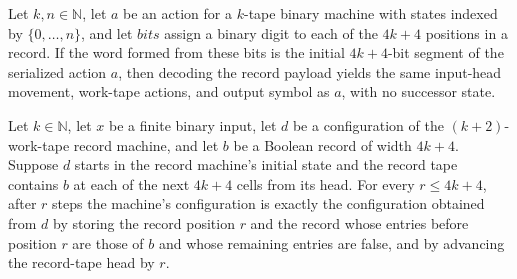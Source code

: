 \begin{lemma}
\label{Turing.StepBlock.payload_correct}
\leanok
{}
Let $k,n\in\mathbb N$, let $a$ be an action for a $k$-tape binary machine with states
indexed by $\{0,\ldots,n\}$, and let $bits$ assign a binary digit to each of the $4k+4$
positions in a record. If the word formed from these bits is the initial $4k+4$-bit
segment of the serialized action $a$, then decoding the record payload yields the same
input-head movement, work-tape actions, and output symbol as $a$, with no successor
state.
\end{lemma}

\begin{lemma}
\label{Turing.StepBlock.recordTM_read}
\leanok
{}
Let $k\in\mathbb N$, let $x$ be a finite binary input, let $d$ be a configuration of the
$(k+2)$-work-tape record machine, and let $b$ be a Boolean record of width $4k+4$.
Suppose $d$ starts in the record machine's initial state and the record tape contains
$b$ at each of the next $4k+4$ cells from its head. For every $r\le 4k+4$, after $r$
steps the machine's configuration is exactly the configuration obtained from $d$ by
storing the record position $r$ and the record whose entries before position $r$ are
those of $b$ and whose remaining entries are false, and by advancing the record-tape
head by $r$.
\end{lemma}

